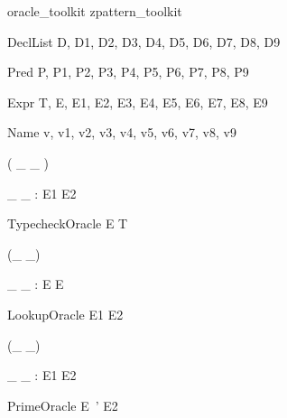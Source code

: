 \documentclass{article}
\begin{document}
\begin{zsection}
  \SECTION oracle\_toolkit \parents zpattern\_toolkit
\end{zsection}

\begin{zedjoker}{DeclList} D, D1, D2, D3, D4, D5, D6, D7, D8, D9 \end{zedjoker}
\begin{zedjoker}{Pred} P, P1, P2, P3, P4, P5, P6, P7, P8, P9 \end{zedjoker}
\begin{zedjoker}{Expr} T, E, E1, E2, E3, E4, E5, E6, E7, E8, E9 \end{zedjoker}
\begin{zedjoker}{Name} v, v1, v2, v3, v4, v5, v6, v7, v8, v9 \end{zedjoker}


\begin{zed}
  \relation ( \_ \hasType \_ )
\end{zed}

\begin{gendef}[E1,E2]
  \_ \hasType \_ : E1 \rel E2
\end{gendef}

\begin{zedoracle}{TypecheckOracle}
  E \hasType T
\end{zedoracle}




\begin{zed}
  \relation (\_ \hasDefn \_)
\end{zed}

\begin{gendef}[E]
  \_ \hasDefn \_ : E \rel E
\end{gendef}

\begin{zedoracle}{LookupOracle}
  E1 \hasDefn E2
\end{zedoracle}




\begin{zed}
  \relation (\_ \is \_)
\end{zed}

\begin{gendef}[E1,E2]
  \_ \is \_ : E1 \rel E2
\end{gendef}

\begin{zedoracle}{PrimeOracle}
  E~' \is E2
\end{zedoracle}
\end{document}
